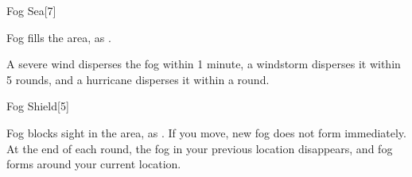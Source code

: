 \begin{spellsection}{Fog Sea}[7]
    \begin{spellheader}
    \end{spellheader}
    \begin{spellcontent}
        \begin{spelltargetinginfo}
        \end{spelltargetinginfo}
        \begin{spelleffects}
            \spelleffect Fog fills the area, as .
        \end{spelleffects}
    \end{spellcontent}
    \begin{spellfooter}
        \spellnotes \fogspellnotes A severe wind disperses the fog within 1 minute, a windstorm disperses it within 5 rounds, and a hurricane disperses it within a round.

        \physicalspellnotes
        \miscastexplode
    \end{spellfooter}
\end{spellsection}

\begin{spellsection}{Fog Shield}[5]
    \begin{spellheader}
    \end{spellheader}
    \begin{spellcontent}
        \begin{spelltargetinginfo}
        \end{spelltargetinginfo}
        \begin{spelleffects}
            \spelleffect Fog blocks sight in the area, as . If you move, new fog does not form immediately. At the end of each round, the fog in your previous location disappears, and fog forms around your current location.
            \spelldur \durshort
        \end{spelleffects}
    \end{spellcontent}
    \begin{spellfooter}
        \spellnotes \fogspellnotes \fogwindspellnotes
        \miscastexplode
    \end{spellfooter}
\end{spellsection}

